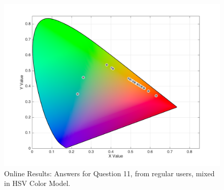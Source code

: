\begin{figure}[htbp]
\begin{minipage}{0.48\textwidth}
    \includegraphics[width=\textwidth]{images/results/11_online_HSVresponses.png}
    \caption[Online Results: Answers for Question 11, from regular users, mixed in HSV Color Model.]{Online Results: Answers for Question 11, from regular users, mixed in HSV Color Model.}
    \label{fig:onlinehsvregular_11}
  \end{minipage}
\end{figure}
%
